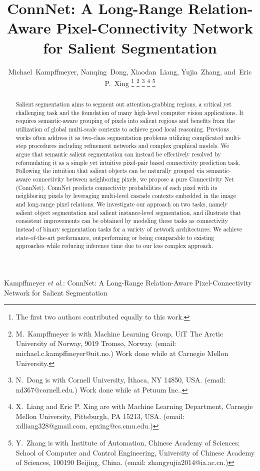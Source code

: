 \documentclass[journal]{IEEEtran}
\begin{document}
\title{ConnNet: A Long-Range Relation-Aware Pixel-Connectivity Network for Salient Segmentation}

\author{Michael~Kampffmeyer,
        Nanqing~Dong,
        Xiaodan~Liang,
        Yujia~Zhang,
        and~Eric P.~Xing%
\thanks{The first two authors contributed equally to this work.}
\thanks{M.~Kampffmeyer is with Machine Learning Group, UiT The Arctic University of Norway, 9019 Troms{\o}, Norway. (email: michael.c.kampffmeyer@uit.no.) Work done while at Carnegie Mellon University.}
\thanks{N.~Dong is with Cornell University, Ithaca, NY 14850, USA. (email: nd367@cornell.edu.) Work done while at Petuum Inc..}
\thanks{X.~Liang and Eric P. Xing are with Machine Learning Department, Carnegie Mellon University, Pittsburgh, PA 15213, USA. (email: xdliang328@gmail.com, epxing@cs.cmu.edu.)}
\thanks{Y.~Zhang is with Institute of Automation, Chinese Academy of Sciences; School of Computer and Control Engineering, University of Chinese Academy of Sciences, 100190 Beijing, China. (email: zhangyujia2014@ia.ac.cn.)}}


\markboth{}%
{Kampffmeyer \MakeLowercase{\textit{et al.}}: ConnNet: A Long-Range Relation-Aware Pixel-Connectivity Network for Salient Segmentation}

\maketitle

\begin{abstract}
Salient segmentation aims to segment out attention-grabbing regions, a critical yet challenging task and the foundation of many high-level computer vision applications. 
It requires semantic-aware grouping of pixels into salient regions and benefits from the utilization of global multi-scale contexts to achieve good local reasoning.
Previous works often address it as two-class segmentation problems utilizing complicated multi-step procedures including refinement networks and complex graphical models.
We argue that semantic salient segmentation can instead be effectively resolved by reformulating it as a simple yet intuitive pixel-pair based connectivity prediction task. Following the intuition that salient objects can be naturally grouped via semantic-aware connectivity between neighboring pixels, we propose a pure Connectivity Net (ConnNet). ConnNet predicts connectivity probabilities of each pixel with its neighboring pixels by leveraging multi-level cascade contexts embedded in the image and long-range pixel relations.  We investigate our approach on two tasks, namely salient object segmentation and salient instance-level segmentation, and illustrate that consistent improvements can be obtained by modeling these tasks as connectivity instead of binary segmentation tasks for a variety of network architectures. We achieve state-of-the-art performance, outperforming or being comparable to existing approaches while reducing inference time due to our less complex approach. 

\end{abstract}
\end{document}
